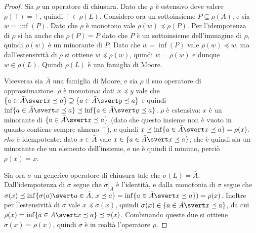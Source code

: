 \documentclass[12pt]{article}
\numberwithin{theorem}{subsection}
\begin{document}
\begin{proof}
	Sia $\rho$ un operatore di chiusura. Dato che $\rho$ è estensivo deve valere $\rho(\top) = \top$, quindi $\top \in \rho(L)$. Considero ora un sottoinsieme $P \subseteq \rho(A)$, e sia $w = \inf(P)$. Dato che $\rho$ è monotono vale $\rho(w) \preceq \rho(P)$. Per l'idempotenza di $\rho$ si ha anche che $\rho(P) = P$ dato che $P$ è un sottoinsieme dell'immagine di $\rho$, quindi $\rho(w)$ è un minorante di $P$. Dato che $w = \inf(P)$ vale $\rho(w) \preceq w$, ma dall'estensività di $\rho$ si ottiene $w \preceq \rho(w)$, quindi $w = \rho(w)$ e dunque $w \in \rho(L)$. Quindi $\rho(L)$ è una famiglia di Moore.
	
	Viceversa sia $\bar{A}$ una famiglia di Moore, e sia $\rho$ il suo operatore di approssimazione.
	$\rho$ è monotona: dati $x \preceq y$ vale che $\{ a \in \bar{A} \svert x \preceq a \} \supseteq \{ a \in \bar{A} \svert y \preceq a \}$ e quindi $\inf \{ a \in \bar{A} \svert x \preceq a \} \preceq \inf \{ a \in \bar{A} \svert y \preceq a \}$.
	$\rho$ è estensiva: $x$ è un minorante di $\{ a \in \bar{A} \svert x \preceq a \}$ (dato che questo insieme non è vuoto in quanto contiene sempre almeno $\top$), e quindi $x \preceq \inf \{ a \in \bar{A} \svert x \preceq a \} = \rho(x)$.
	$rho$ è idempotente: dato $x \in \bar{A}$ vale $x \in \{ a \in \bar{A} \svert x \preceq a \}$, che è quindi sia un minorante che un elemento dell'insieme, e ne è quindi il minimo, perciò $\rho(x) = x$.

	Sia ora $\sigma$ un generico operatore di chiusura tale che $\sigma(L) = \bar{A}$. Dall'idempotenza di $\sigma$ segue che $\left. \sigma \right|_{\bar{A}}$ è l'identità, e dalla monotonia di $\sigma$ segue che $\sigma(x) \preceq \inf \{ \sigma(a) \svert a \in \bar{A}, \, x \preceq a \} = \inf \{ a \in \bar{A} \svert x \preceq a \} )= \rho(x)$.
	Inoltre per l'estensività di $\sigma$ vale $x \preceq \sigma(x)$, quindi $\sigma(x) \in \{ a \in \bar{A} \svert x \preceq a \}$, da cui $\rho(x) = \inf \{ a \in \bar{A} \svert x \preceq a \} \preceq \sigma(x)$.
	Combinando queste due si ottiene $\sigma(x) = \rho(x)$, quindi $\sigma$ è in realtà l'operatore $\rho$.
\end{proof}
\end{document}
